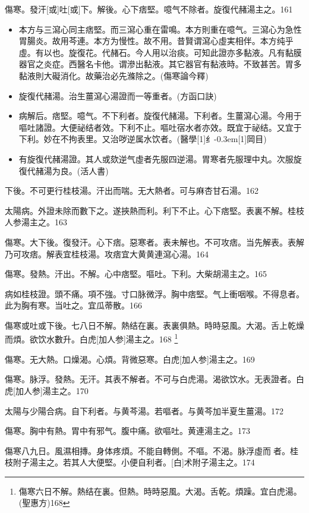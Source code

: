 \documentclass[oneside,b4paper]{ctexbook}
\begin{document}
\begin{flushleft}
傷寒。發汗[或]吐[或]下。解後。心下痞堅。噫气不除者。旋復代赭湯主之。161

\begin{itemize}
\item 本方与三瀉心同主痞堅。而三瀉心重在雷鳴。本方則重在噫气。三瀉心为急性胃腸炎。故用芩連。本方为慢性。故不用。昔賢谓瀉心虛実相伴。本方纯乎虛。有以也。旋復花。代赭石。今人用以治痰。可知此證亦多黏液。凡有黏膜器官之炎症。西醫名卡他。谓滲出黏液。其它器官有黏液時。不致甚苦。胃多黏液則大礙消化。故藥治必先滌除之。(傷寒論今釋)
\item 旋復代赭湯。治生薑瀉心湯證而一等重者。(方函口訣)
\item 病解后。痞堅。噫气。不下利者。旋復代赭湯。下利者。生薑瀉心湯。今用于嘔吐諸證。大便祕结者效。下利不止。嘔吐宿水者亦效。既宜于祕结。又宜于下利。妙在不拘表里。又治哕逆属水饮者。(醫學{\hbox{\scalebox{0.6}[1]{纟}\kern-0.3em\scalebox{0.63}[1]{岡}}}目)
\item 有旋復代赭湯證。其人或欬逆气虛者先服四逆湯。胃寒者先服理中丸。次服旋復代赭湯为良。(活人書)
\end{itemize}

下後。不可更行桂枝湯。汗出而喘。无大熱者。可与麻杏甘石湯。162

太陽病。外證未除而數下之。遂挾熱而利。利下不止。心下痞堅。表裏不解。桂枝人参湯主之。163

傷寒。大下後。復發汗。心下痞。惡寒者。表未解也。不可攻痞。当先解表。表解乃可攻痞。解表宜桂枝湯。攻痞宜大黄黄連瀉心湯。164

傷寒。發熱。汗出。不解。心中痞堅。嘔吐。下利。大柴胡湯主之。165

病如桂枝證。頭不痛。項不強。寸口脉微浮。胸中痞堅。气上衝咽喉。不得息者。此为胸有寒。当吐之。宜瓜蒂散。166

傷寒或吐或下後。七八日不解。熱结在裏。表裏俱熱。時時惡風。大渴。舌上乾燥而煩。欲饮水數升。白虎[加人参]湯主之。168
\footnote{傷寒六日不解。熱结在裏。但熱。時時惡風。大渴。舌乾。煩躁。宜白虎湯。(聖惠方)168}

傷寒。无大熱。口燥渴。心煩。背微惡寒。白虎[加人参]湯主之。169

傷寒。脉浮。發熱。无汗。其表不解者。不可与白虎湯。渴欲饮水。无表證者。白虎[加人参]湯主之。170

太陽与少陽合病。自下利者。与黄芩湯。若嘔者。与黄芩加半夏生薑湯。172

傷寒。胸中有熱。胃中有邪气。腹中痛。欲嘔吐。黄連湯主之。173

傷寒八九日。風濕相摶。身体疼煩。不能自轉側。不嘔。不渴。脉浮虛而{𬈧}者。桂枝附子湯主之。若其人大便堅。小便自利者。[白]术附子湯主之。174


\end{flushleft}
\end{document}
